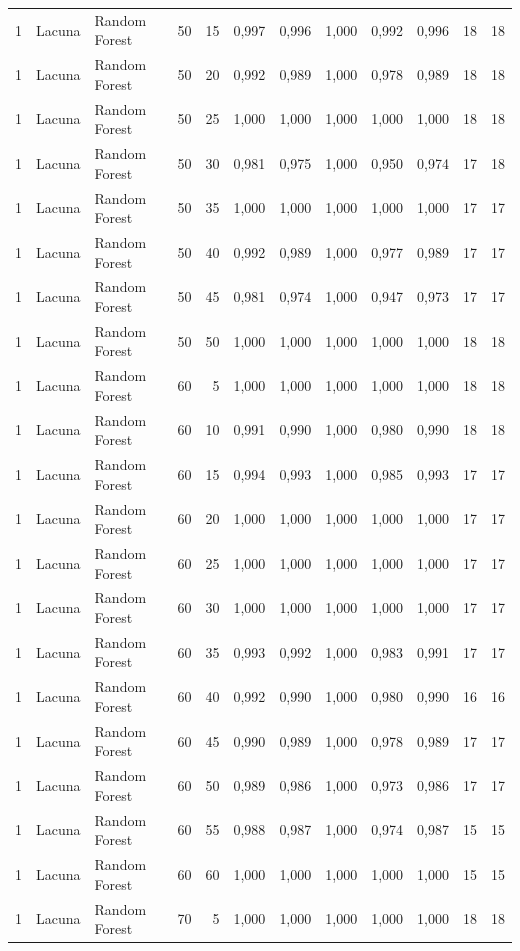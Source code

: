 \begin{longtable}{@{}rllrrrrrrrrr@{}}
1 & Lacuna & Random Forest & 50 & 15 & 0,997 & 0,996 & 1,000 & 0,992 & 0,996 & 18 & 18 \\
1 & Lacuna & Random Forest & 50 & 20 & 0,992 & 0,989 & 1,000 & 0,978 & 0,989 & 18 & 18 \\
1 & Lacuna & Random Forest & 50 & 25 & 1,000 & 1,000 & 1,000 & 1,000 & 1,000 & 18 & 18 \\
1 & Lacuna & Random Forest & 50 & 30 & 0,981 & 0,975 & 1,000 & 0,950 & 0,974 & 17 & 18 \\
1 & Lacuna & Random Forest & 50 & 35 & 1,000 & 1,000 & 1,000 & 1,000 & 1,000 & 17 & 17 \\
1 & Lacuna & Random Forest & 50 & 40 & 0,992 & 0,989 & 1,000 & 0,977 & 0,989 & 17 & 17 \\
1 & Lacuna & Random Forest & 50 & 45 & 0,981 & 0,974 & 1,000 & 0,947 & 0,973 & 17 & 17 \\
1 & Lacuna & Random Forest & 50 & 50 & 1,000 & 1,000 & 1,000 & 1,000 & 1,000 & 18 & 18 \\
1 & Lacuna & Random Forest & 60 & 5 & 1,000 & 1,000 & 1,000 & 1,000 & 1,000 & 18 & 18 \\
1 & Lacuna & Random Forest & 60 & 10 & 0,991 & 0,990 & 1,000 & 0,980 & 0,990 & 18 & 18 \\
1 & Lacuna & Random Forest & 60 & 15 & 0,994 & 0,993 & 1,000 & 0,985 & 0,993 & 17 & 17 \\
1 & Lacuna & Random Forest & 60 & 20 & 1,000 & 1,000 & 1,000 & 1,000 & 1,000 & 17 & 17 \\
1 & Lacuna & Random Forest & 60 & 25 & 1,000 & 1,000 & 1,000 & 1,000 & 1,000 & 17 & 17 \\
1 & Lacuna & Random Forest & 60 & 30 & 1,000 & 1,000 & 1,000 & 1,000 & 1,000 & 17 & 17 \\
1 & Lacuna & Random Forest & 60 & 35 & 0,993 & 0,992 & 1,000 & 0,983 & 0,991 & 17 & 17 \\
1 & Lacuna & Random Forest & 60 & 40 & 0,992 & 0,990 & 1,000 & 0,980 & 0,990 & 16 & 16 \\
1 & Lacuna & Random Forest & 60 & 45 & 0,990 & 0,989 & 1,000 & 0,978 & 0,989 & 17 & 17 \\
1 & Lacuna & Random Forest & 60 & 50 & 0,989 & 0,986 & 1,000 & 0,973 & 0,986 & 17 & 17 \\
1 & Lacuna & Random Forest & 60 & 55 & 0,988 & 0,987 & 1,000 & 0,974 & 0,987 & 15 & 15 \\
1 & Lacuna & Random Forest & 60 & 60 & 1,000 & 1,000 & 1,000 & 1,000 & 1,000 & 15 & 15 \\
1 & Lacuna & Random Forest & 70 & 5 & 1,000 & 1,000 & 1,000 & 1,000 & 1,000 & 18 & 18 \\

\end{longtable}
